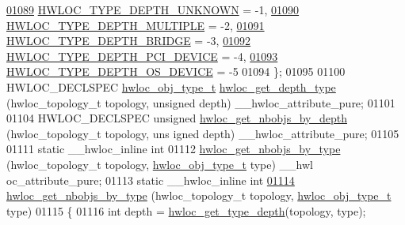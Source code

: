 \begin{DoxyCode}
\hypertarget{a00033_source_l01089}{}\hyperlink{a00046_ggaf4e663cf42bbe20756b849c6293ef575a0565ab92ab72cb0cec91e23003294aad}{01089}     \hyperlink{a00046_ggaf4e663cf42bbe20756b849c6293ef575a0565ab92ab72cb0cec91e23003294aad}{HWLOC_TYPE_DEPTH_UNKNOWN} = -1,    
\hypertarget{a00033_source_l01090}{}\hyperlink{a00046_ggaf4e663cf42bbe20756b849c6293ef575ae99465995cacde6c210d5fc2e409798c}{01090}     \hyperlink{a00046_ggaf4e663cf42bbe20756b849c6293ef575ae99465995cacde6c210d5fc2e409798c}{HWLOC_TYPE_DEPTH_MULTIPLE} = -2,   
\hypertarget{a00033_source_l01091}{}\hyperlink{a00046_ggaf4e663cf42bbe20756b849c6293ef575af93b50182973e4a718d9d4db9e253a90}{01091}     \hyperlink{a00046_ggaf4e663cf42bbe20756b849c6293ef575af93b50182973e4a718d9d4db9e253a90}{HWLOC_TYPE_DEPTH_BRIDGE} = -3,     
\hypertarget{a00033_source_l01092}{}\hyperlink{a00046_ggaf4e663cf42bbe20756b849c6293ef575ad8b1516e699b57ce1c8d107fbd2f674c}{01092}     \hyperlink{a00046_ggaf4e663cf42bbe20756b849c6293ef575ad8b1516e699b57ce1c8d107fbd2f674c}{HWLOC_TYPE_DEPTH_PCI_DEVICE} = -4, 
\hypertarget{a00033_source_l01093}{}\hyperlink{a00046_ggaf4e663cf42bbe20756b849c6293ef575afe9a2131073eebbe129d4aa2928d3f46}{01093}     \hyperlink{a00046_ggaf4e663cf42bbe20756b849c6293ef575afe9a2131073eebbe129d4aa2928d3f46}{HWLOC_TYPE_DEPTH_OS_DEVICE} = -5   
01094 \};
01095 
01100 HWLOC\_DECLSPEC \hyperlink{a00041_gacd37bb612667dc437d66bfb175a8dc55}{hwloc_obj_type_t} \hyperlink{a00046_gadd4964764ae7e49231065d58a553fd31}{hwloc_get_depth_type} (hwloc\_topology\_t topology, 
      \textcolor{keywordtype}{unsigned} depth) \_\_hwloc\_attribute\_pure;
01101 
01104 HWLOC\_DECLSPEC \textcolor{keywordtype}{unsigned} \hyperlink{a00046_ga20cfe2456f4cfdd789c9aca6d2fdd69f}{hwloc_get_nbobjs_by_depth} (hwloc\_topology\_t topology, \textcolor{keywordtype}{uns
      igned} depth) \_\_hwloc\_attribute\_pure;
01105 
01111 \textcolor{keyword}{static} \_\_hwloc\_inline \textcolor{keywordtype}{int}
01112 \hyperlink{a00046_gaba821f84ef64282d14577066e6d6547e}{hwloc_get_nbobjs_by_type} (hwloc\_topology\_t topology, \hyperlink{a00041_gacd37bb612667dc437d66bfb175a8dc55}{hwloc_obj_type_t} type) \_\_hwl
      oc\_attribute\_pure;
01113 \textcolor{keyword}{static} \_\_hwloc\_inline \textcolor{keywordtype}{int}
\hypertarget{a00033_source_l01114}{}\hyperlink{a00046_gaba821f84ef64282d14577066e6d6547e}{01114} \hyperlink{a00046_gaba821f84ef64282d14577066e6d6547e}{hwloc_get_nbobjs_by_type} (hwloc\_topology\_t topology, \hyperlink{a00041_gacd37bb612667dc437d66bfb175a8dc55}{hwloc_obj_type_t} type)
01115 \{
01116         \textcolor{keywordtype}{int} depth = \hyperlink{a00046_gaea7c64dd59467f5201ba87712710b14d}{hwloc_get_type_depth}(topology, type);

\end{DoxyCode}
